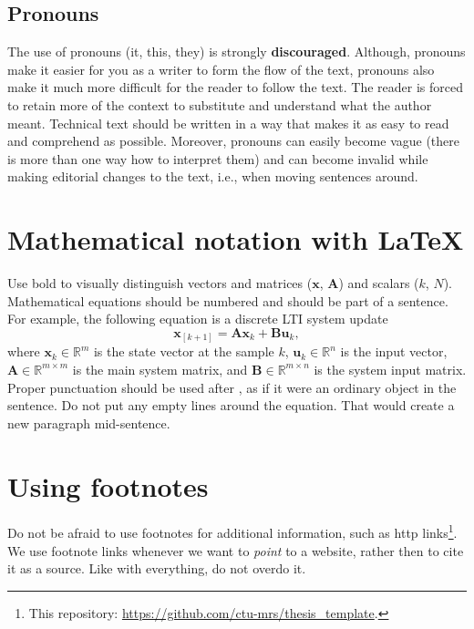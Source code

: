\subsection{Pronouns}

The use of pronouns (it, this, they) is strongly \textbf{discouraged}.
Although, pronouns make it easier for you as a writer to form the flow of the text, pronouns also make it much more difficult for the reader to follow the text.
The reader is forced to retain more of the context to substitute and understand what the author meant.
Technical text should be written in a way that makes it as easy to read and comprehend as possible.
Moreover, pronouns can easily become vague (there is more than one way how to interpret them) and can become invalid while making editorial changes to the text, i.e., when moving sentences around.

\section{Mathematical notation with LaTeX}

Use bold to visually distinguish vectors and matrices ($\mathbf{x}$, $\mathbf{A}$) and scalars ($k$, $N$).
Mathematical equations should be numbered and should be part of a sentence.
For example, the following equation is a discrete LTI system update
\begin{equation}
  \mathbf{x}_{\left[k+1\right]} = \mathbf{A}\mathbf{x}_k + \mathbf{B}\mathbf{u}_k,
  \label{eq:lti_system}
\end{equation}
where $\mathbf{x}_k \in \mathbb{R}^m$ is the state vector at the sample $k$, $\mathbf{u}_k \in \mathbb{R}^n$ is the input vector, $\mathbf{A} \in \mathbb{R}^{m \times m}$ is the main system matrix, and $\mathbf{B} \in \mathbb{R}^{m \times n}$ is the system input matrix.
Proper punctuation should be used after , as if it were an ordinary object in the sentence.
Do not put any empty lines around the equation.
That would create a new paragraph mid-sentence.

\section{Using footnotes}

Do not be afraid to use footnotes for additional information, such as http links\footnote{This repository: \url{https://github.com/ctu-mrs/thesis_template}.}.
We use footnote links whenever we want to \emph{point} to a website, rather then to cite it as a source.
Like with everything, do not overdo it.

